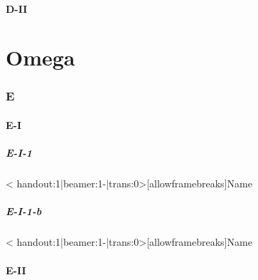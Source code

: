 \documentclass{beamer}[10]
\begin{document}
    \subsection{D-II}

\part{Omega}

\section{E}
    \subsection{E-I}
        \subsubsection{E-I-1}
                    \begin{frame}< handout:1|beamer:1-|trans:0>[allowframebreaks]{Name}{\subsubsecname}		\end{frame}
        \subsubsection{E-I-1-b}
                    \begin{frame}< handout:1|beamer:1-|trans:0>[allowframebreaks]{Name}{\subsubsecname}		\end{frame}
    \subsection{E-II}
\end{document}

